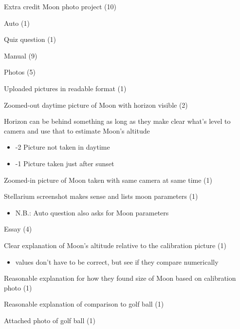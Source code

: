 \documentclass[12pt]{article}
\begin{document}
Extra credit Moon photo project (10)
\begin{longenum}
\item Auto (1)
    \begin{longenum}
    \item Quiz question (1)
    \end{longenum}
\item Manual (9)
    \begin{longenum}
    \item Photos (5)
        \begin{longenum}
        \item Uploaded pictures in readable format (1)
        \item Zoomed-out daytime picture of Moon with horizon visible (2)
            \begin{longenum}
            \item Horizon can be behind something as long as they make clear what's level to camera and use that to estimate Moon's altitude
                \begin{itemize}
                \item -2 Picture not taken in daytime
                \item -1 Picture taken just after sunset
                \end{itemize}
            \end{longenum}
        \item Zoomed-in picture of Moon taken with same camera at same time (1)
        \item Stellarium screenshot makes sense and lists moon parameters (1)
            \begin{itemize}
            \item N.B.: Auto question also asks for Moon parameters 
            \end{itemize}
        \end{longenum}
    \item Essay (4)
        \begin{longenum}
        \item Clear explanation of Moon's altitude relative to the calibration picture (1)
            \begin{itemize}
            \item values don't have to be correct, but see if they compare numerically
            \end{itemize}
        \item Reasonable explanation for how they found size of Moon based on calibration photo (1)
        \item Reasonable explanation of comparison to golf ball (1)
        \item Attached photo of golf ball (1)
        \end{longenum}
    \end{longenum}
\end{longenum}
\end{document}
